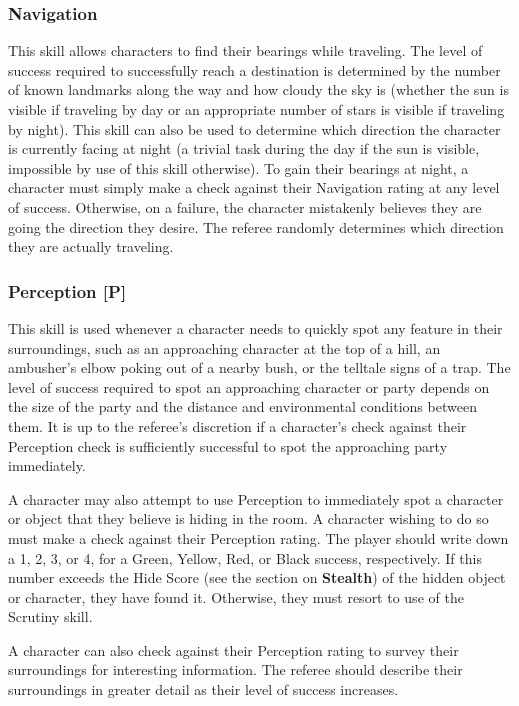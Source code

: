 \documentclass[oneside]{book}
\begin{document}
\begin{multicols}{2}
\subsubsection{Navigation}
This skill allows characters to find their bearings while traveling. The level of success required to successfully reach a destination is determined by the number of known landmarks along the way and how cloudy the sky is (whether the sun is visible if traveling by day or an appropriate number of stars is visible if traveling by night). This skill can also be used to determine which direction the character is currently facing at night (a trivial task during the day if the sun is visible, impossible by use of this skill otherwise). To gain their bearings at night, a character must simply make a check against their Navigation rating at any level of success. Otherwise, on a failure, the character mistakenly believes they are going the direction they desire. The referee randomly determines which direction they are actually traveling.

\subsubsection{Perception [P]}
This skill is used whenever a character needs to quickly spot any feature in their surroundings, such as an approaching character at the top of a hill, an ambusher's elbow poking out of a nearby bush, or the telltale signs of a trap. The level of success required to spot an approaching character or party depends on the size of the party and the distance and environmental conditions between them. It is up to the referee's discretion if a character's check against their Perception check is sufficiently successful to spot the approaching party immediately. 

A character may also attempt to use Perception to immediately spot a character or object that they believe is hiding in the room. A character wishing to do so must make a check against their Perception rating. The player should write down a 1, 2, 3, or 4, for a Green, Yellow, Red, or Black success, respectively. If this number exceeds the Hide Score (see the section on \textbf{Stealth}) of the hidden object or character, they have found it. Otherwise, they must resort to use of the Scrutiny skill.

A character can also check against their Perception rating to survey their surroundings for interesting information. The referee should describe their surroundings in greater detail as their level of success increases. 



\end{multicols}
\end{document}

